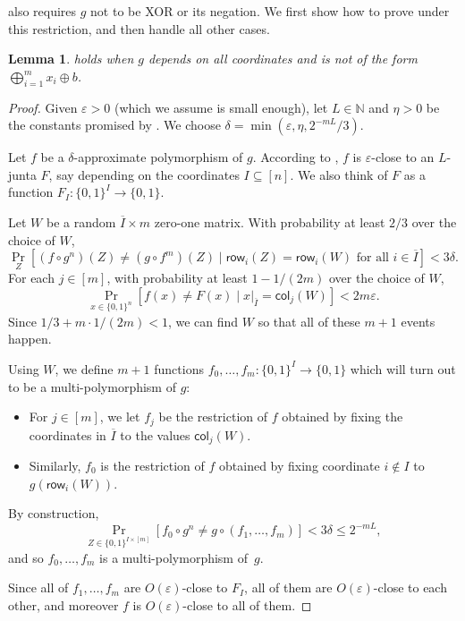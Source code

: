 \documentclass{article}
\newtheorem{lemma}[theorem]{Lemma}
\theoremstyle{definition}
\theoremstyle{remark}
\providecommand{\row}{\mathsf{row}}
\providecommand{\col}{\mathsf{col}}
\newcommand\eps{\varepsilon}
\renewcommand\epsilon{\eps}
\renewcommand\leq{\leqslant}
\begin{document}
 also requires $g$ not to be XOR or its negation. We first show how to prove  under this restriction, and then handle all other cases. 
\begin{lemma} \label{lem:approximate-polymorphisms-not-xor}
 holds when $g$ depends on all coordinates and is not of the form $\bigoplus_{i=1}^m x_i \oplus b$.
\end{lemma}
\begin{proof}
Given $\epsilon > 0$ (which we assume is small enough), let $L \in \mathbb{N}$ and $\eta > 0$ be the constants promised by . We choose $\delta = \min(\epsilon,\eta,2^{-mL}/3)$.

Let $f$ be a $\delta$-approximate polymorphism of $g$. According to , $f$ is $\epsilon$-close to an $L$-junta $F$, say depending on the coordinates $I \subseteq [n]$. We also think of $F$ as a function $F_I\colon \{0,1\}^I \to \{0,1\}$.

Let $W$ be a random $\overline{I} \times m$ zero-one matrix. With probability at least $2/3$ over the choice of $W$,
\[
 \Pr_Z[(f \circ g^n)(Z) \neq (g \circ f^m)(Z) \mid \row_i(Z) = \row_i(W) \text{ for all } i \in \overline{I}] < 3\delta.
\]
For each $j \in [m]$, with probability at least $1-1/(2m)$ over the choice of $W$,
\[
 \Pr_{x \in \{0,1\}^n}[f(x) \neq F(x) \mid x|_{\overline{I}} = \col_j(W)] < 2m\epsilon.
\]
Since $1/3 + m \cdot 1/(2m) < 1$, we can find $W$ so that all of these $m+1$ events happen.

Using $W$, we define $m+1$ functions $f_0,\ldots,f_m\colon \{0,1\}^I \to \{0,1\}$ which will turn out to be a multi-polymorphism of $g$:
\begin{itemize}
    \item For $j \in [m]$, we let $f_j$ be the restriction of $f$ obtained by fixing the coordinates in $\overline{I}$ to the values $\col_j(W)$.
    \item Similarly, $f_0$ is the restriction of $f$ obtained by fixing coordinate $i \notin I$ to $g(\row_i(W))$.
\end{itemize}
By construction,
\[
 \Pr_{Z \in \{0,1\}^{I \times [m]}}[f_0 \circ g^n \neq g \circ (f_1,\ldots,f_m)] < 3\delta \leq 2^{-mL},
\]
and so $f_0,\ldots,f_m$ is a multi-polymorphism of~$g$.

Since all of $f_1,\ldots,f_m$ are $O(\epsilon)$-close to $F_I$, all of them are $O(\epsilon)$-close to each other, and moreover $f$ is $O(\epsilon)$-close to all of them. 


\end{proof}
\end{document}
